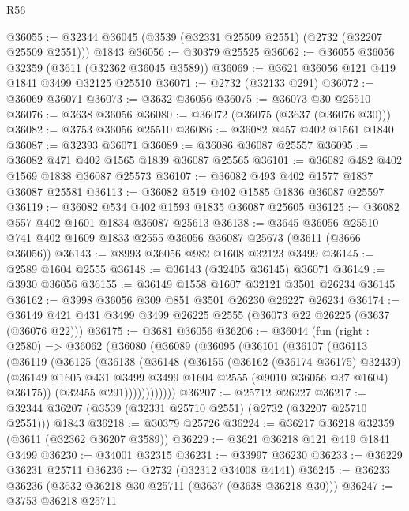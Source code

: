 \begin{lexlean}{R56}
\begin{coremodule}
@36055 := @32344 @36045 (@3539 (@32331 @25509 @2551) (@2732 (@32207 @25509 @2551))) @1843
@36056 := @30379 @25525
@36062 := @36055 @36056 @32359 (@3611 (@32362 @36045 @3589))
@36069 := @3621 @36056 @121 @419 @1841 @3499 @32125 @25510
@36071 := @2732 (@32133 @291)
@36072 := @36069 @36071
@36073 := @3632 @36056
@36075 := @36073 @30 @25510
@36076 := @3638 @36056
@36080 := @36072 (@36075 (@3637 (@36076 @30)))
@36082 := @3753 @36056 @25510
@36086 := @36082 @457 @402 @1561 @1840
@36087 := @32393 @36071
@36089 := @36086 @36087 @25557
@36095 := @36082 @471 @402 @1565 @1839 @36087 @25565
@36101 := @36082 @482 @402 @1569 @1838 @36087 @25573
@36107 := @36082 @493 @402 @1577 @1837 @36087 @25581
@36113 := @36082 @519 @402 @1585 @1836 @36087 @25597
@36119 := @36082 @534 @402 @1593 @1835 @36087 @25605
@36125 := @36082 @557 @402 @1601 @1834 @36087 @25613
@36138 := @3645
    @36056
    @25510
    @741
    @402
    @1609
    @1833
    @2555
    @36056
    @36087
    @25673
    (@3611 (@3666 @36056))
@36143 := @8993 @36056 @982 @1608 @32123 @3499
@36145 := @2589 @1604 @2555
@36148 := @36143 (@32405 @36145) @36071
@36149 := @3930 @36056
@36155 := @36149 @1558 @1607 @32121 @3501 @26234 @36145
@36162 := @3998 @36056 @309 @851 @3501 @26230 @26227 @26234
@36174 := @36149 @421 @431 @3499 @3499 @26225 @2555 (@36073 @22 @26225 (@3637 (@36076 @22)))
@36175 := @3681 @36056
@36206 := @36044
    (fun (right : @2580) =>
    @36062
      (@36080
        (@36089
          (@36095
            (@36101
              (@36107
                (@36113
                  (@36119
                    (@36125
                      (@36138
                        (@36148
                          (@36155
                            (@36162 (@36174 @36175) @32439)
                            (@36149
                              @1605
                              @431
                              @3499
                              @3499
                              @1604
                              @2555
                              (@9010 @36056 @37 @1604)
                              @36175))
                          (@32455 @291))))))))))))
@36207 := @25712 @26227
@36217 := @32344 @36207 (@3539 (@32331 @25710 @2551) (@2732 (@32207 @25710 @2551))) @1843
@36218 := @30379 @25726
@36224 := @36217 @36218 @32359 (@3611 (@32362 @36207 @3589))
@36229 := @3621 @36218 @121 @419 @1841 @3499
@36230 := @34001 @32315
@36231 := @33997 @36230
@36233 := @36229 @36231 @25711
@36236 := @2732 (@32312 @34008 @4141)
@36245 := @36233 @36236 (@3632 @36218 @30 @25711 (@3637 (@3638 @36218 @30)))
@36247 := @3753 @36218 @25711

\end{coremodule}
\end{lexlean}
